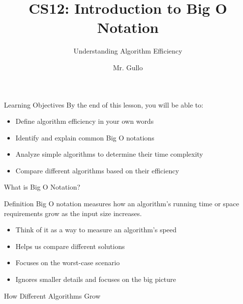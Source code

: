 \documentclass{beamer}
\title[Big O Notation]{CS12: Introduction to Big O Notation}
\subtitle{Understanding Algorithm Efficiency}
\author[Mr. Gullo]{Mr. Gullo}
\date{}
\begin{document}
\begin{frame}
    \titlepage
\end{frame}

\begin{frame}{Learning Objectives}
    By the end of this lesson, you will be able to:
    \begin{itemize}
        \item Define algorithm efficiency in your own words
        \item Identify and explain common Big O notations
        \item Analyze simple algorithms to determine their time complexity
        \item Compare different algorithms based on their efficiency
    \end{itemize}
\end{frame}

\begin{frame}{What is Big O Notation?}
    \begin{block}{Definition}
        Big O notation measures how an algorithm's running time or space requirements grow as the input size increases.
    \end{block}
    
    \begin{itemize}
        \item Think of it as a way to measure an algorithm's speed
        \item Helps us compare different solutions
        \item Focuses on the worst-case scenario
        \item Ignores smaller details and focuses on the big picture
    \end{itemize}
\end{frame}

\begin{frame}{How Different Algorithms Grow}
    \begin{center}
    \end{center}
\end{frame}
\end{document}
